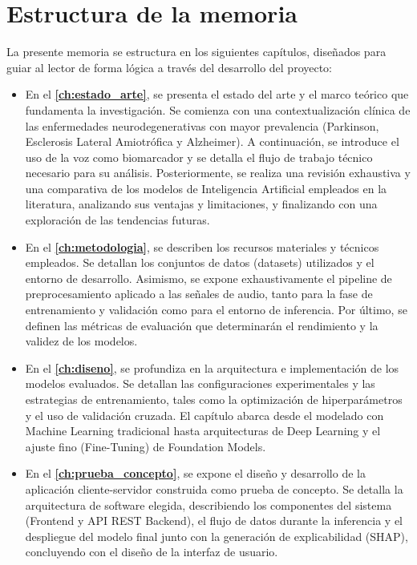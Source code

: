 \section{Estructura de la memoria}
La presente memoria se estructura en los siguientes capítulos, diseñados para guiar al lector de forma lógica a través del desarrollo del proyecto:

\begin{itemize}
    
    \item En el \textbf{\autoref{ch:estado_arte}}, se presenta el estado del arte y el marco teórico que fundamenta la investigación. Se comienza con una contextualización clínica de las enfermedades neurodegenerativas con mayor prevalencia (Parkinson, Esclerosis Lateral Amiotrófica y Alzheimer). A continuación, se introduce el uso de la voz como biomarcador y se detalla el flujo de trabajo técnico necesario para su análisis. Posteriormente, se realiza una revisión exhaustiva y una comparativa de los modelos de Inteligencia Artificial empleados en la literatura, analizando sus ventajas y limitaciones, y finalizando con una exploración de las tendencias futuras.
    
    \item En el \textbf{\autoref{ch:metodologia}}, se describen los recursos materiales y técnicos empleados. Se detallan los conjuntos de datos (datasets) utilizados y el entorno de desarrollo. Asimismo, se expone exhaustivamente el pipeline de preprocesamiento aplicado a las señales de audio, tanto para la fase de entrenamiento y validación como para el entorno de inferencia. Por último, se definen las métricas de evaluación que determinarán el rendimiento y la validez de los modelos.
    
    \item En el \textbf{\autoref{ch:diseno}}, se profundiza en la arquitectura e implementación de los modelos evaluados. Se detallan las configuraciones experimentales y las estrategias de entrenamiento, tales como la optimización de hiperparámetros y el uso de validación cruzada. El capítulo abarca desde el modelado con Machine Learning tradicional hasta arquitecturas de Deep Learning y el ajuste fino (Fine-Tuning) de Foundation Models.
    
    \item En el \textbf{\autoref{ch:prueba_concepto}}, se expone el diseño y desarrollo de la aplicación cliente-servidor construida como prueba de concepto. Se detalla la arquitectura de software elegida, describiendo los componentes del sistema (Frontend y API REST Backend), el flujo de datos durante la inferencia y el despliegue del modelo final junto con la generación de explicabilidad (SHAP), concluyendo con el diseño de la interfaz de usuario.
    

\end{itemize}
